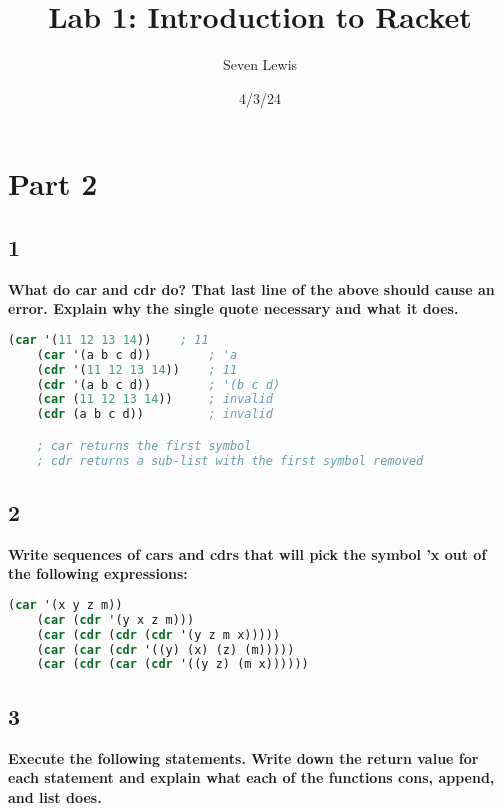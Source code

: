 \documentclass{article}
\title{Lab 1: Introduction to Racket}
\author{Seven Lewis}
\date{4/3/24}
\begin{document}
\maketitle


\section*{Part 2}
\subsection*{1}
\begin{adjustwidth}{2em}{0em}
    \textbf{What do car and cdr do? That last line of the above should cause an error. Explain why the single quote necessary and what it does.} 
\end{adjustwidth}


\begin{lstlisting}[language=lisp,style=redStyle]
    (car '(11 12 13 14))    ; 11
    (car '(a b c d))        ; 'a
    (cdr '(11 12 13 14))    ; 11
    (cdr '(a b c d))        ; '(b c d)
    (car (11 12 13 14))     ; invalid
    (cdr (a b c d))         ; invalid

    ; car returns the first symbol
    ; cdr returns a sub-list with the first symbol removed
\end{lstlisting}

\subsection*{2}
\begin{adjustwidth}{2em}{0em}
    \textbf{Write sequences of cars and cdrs that will pick the symbol 'x out of the following expressions:}
\end{adjustwidth}

\begin{lstlisting}[language=lisp,style=redStyle]
    (car '(x y z m))
    (car (cdr '(y x z m)))
    (car (cdr (cdr (cdr '(y z m x)))))
    (car (car (cdr '((y) (x) (z) (m)))))
    (car (cdr (car (cdr '((y z) (m x))))))
\end{lstlisting}

\subsection*{3}
\begin{adjustwidth}{2em}{0em}
    \textbf{Execute the following statements. Write down the return value for each statement and explain what each of the functions cons, append, and list does.}
\end{adjustwidth}
\end{document}
